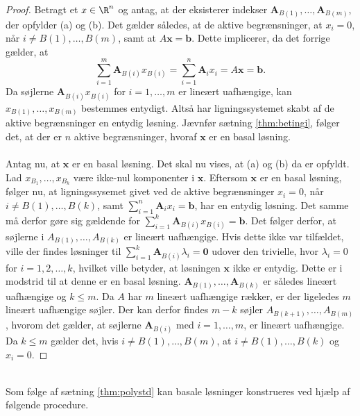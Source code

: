 \begin{proof}
Betragt et $x \in \R^n$ og antag, at der eksisterer indekser $\mathbf{A}_{B(1)},\ldots,\mathbf{A}_{B(m)}$, der opfylder (a) og (b).
%
Det gælder således, at de aktive begrænsninger, at $x_i=0$, når $i\neq B(1),\ldots,B(m)$, samt at $A\mathbf{x}=\mathbf{b}$.
Dette implicerer, da det forrige gælder,  at 
%
$$\sum_{i=1}^{m}\textbf{A}_{B(i)}x_{B(i)}=\sum_{i=1}^{n}\textbf{A}_ix_i=A\textbf{x}=\textbf{b}.$$
%
Da søjlerne $\textbf{A}_{B(i)}x_{B(i)}$ for $i=1,\ldots,m$ er lineært uafhængige, kan $x_{B(1)},\ldots,x_{B(m)}$ bestemmes entydigt. 
Altså har ligningssystemet skabt af de aktive begrænsninger en entydig løsning.
Jævnfør sætning \ref{thm:betingi},
følger det, at der er $n$ aktive begrænsninger, hvoraf $\mathbf{x}$ er en basal løsning. 
\\\\
%
%
Antag nu, at $\mathbf{x}$ er en basal løsning. 
Det skal nu vises, at (a) og (b) da er opfyldt.
Lad $x_{B_1},\ldots,x_{B_k}$ være ikke-nul komponenter i $\textbf{x}$.
Eftersom $\mathbf{x}$ er en basal løsning, følger nu, at ligningssysemet givet ved de aktive begrænsninger $x_i=0$, når $i\neq B(1),\ldots,B(k)$, samt  $\sum_{i=1}^{n}\mathbf{A}_ix_i=\mathbf{b}$, har en entydig løsning. 
Det samme må derfor gøre sig gældende for $\sum_{i=1}^{k}\mathbf{A}_{B(i)}x_{B(i)}=\mathbf{b}$.
Det følger derfor, at søjlerne i $A_{B(1)},\ldots,A_{B(k)}$ er lineært uafhængige.
%
Hvis dette ikke var tilfældet, ville der findes løsninger til $\sum_{i=1}^{k}\mathbf{A}_{B(i)} \lambda_i=\mathbf{0}$ udover den trivielle, hvor $\lambda_i=0$ for $i=1,2,\ldots,k$, hvilket ville betyder, at løsningen $\mathbf{x}$ ikke er entydig. 
Dette er i modstrid til at denne er en basal løsning.
$\mathbf{A}_{B(1)},\ldots ,\mathbf{A}_{B(k)}$ er således lineært uafhængige og $k \leq m$.
Da $A$ har $m$ lineært uafhængige rækker, er der ligeledes $m$ lineært uafhængige søjler.
Der kan derfor findes $m-k$ søjler $A_{B(k+1)},\ldots,A_{B(m)}$, hvorom det gælder, at søjlerne $\mathbf{A}_{B(i)}$ med $i=1,\ldots,m$, er lineært uafhængige.
Da $k \leq m$ gælder det, hvis $i \neq B(1),\ldots,B(m)$, at $i \neq B(1),\ldots,B(k)$ og $x_i=0$.
%
\end{proof}
\\
\noindent
Som følge af sætning \ref{thm:polystd} kan basale løsninger konstrueres ved hjælp af følgende procedure.
